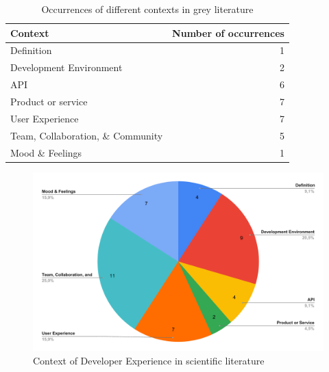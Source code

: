\documentclass[english, 12pt, a4paper, sci, utf8, a-1b, online]{aaltothesis}
\begin{document}
\begin{table}[ht]
  \begin{center}
    \begin{tabular}{l r}
      Context                           & Number of occurrences \\
      \hline
      Definition                        & 1                    \\
      Development Environment           & 2                    \\
      API                               & 6                    \\
      Product or service                & 7                    \\
      User Experience                   & 7                    \\
      Team, Collaboration, \& Community & 5                    \\
      Mood \& Feelings                  & 1                    \\
      \hline
    \end{tabular}
    \caption{Occurrences of different contexts in grey literature}
  \end{center}
\end{table}

\begin{figure}[ht]
  \caption{Context of Developer Experience in scientific literature}
  \begin{center}
    \includegraphics[width=\textwidth]{context-scientific.pdf}
  \end{center}
\end{figure}
\end{document}
